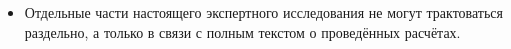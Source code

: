 \begin{itemize}
	
\item  {Отдельные части настоящего экспертного исследования не могут трактоваться раздельно, а только в связи с полным текстом о проведённых расчётах.}

\end{itemize}
